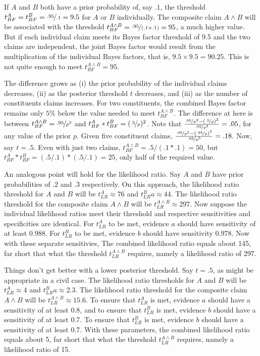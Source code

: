 \documentclass[
  10pt,
  dvipsnames,enabledeprecatedfontcommands]{scrartcl}
\begin{document}

If \(A\) and \(B\) both have a prior probability of, say \(.1\), the
threshold \(t^A_{BF}=t_{BF}^B=\nicefrac{.95}{.1}=9.5\) for \(A\) or
\(B\) individually. The composite claim \(A \wedge B\) will be
associated with the threshold
\(t^{A\wedge B}_{BF}=\nicefrac{.95}{(.1\times .1)}=95\), a much higher
value. But if each individual claim meets its Bayes factor threshold of
9.5 and the two claims are independent, the joint Bayes factor would
result from the multiplication of the individual Bayes factors, that is,
\(9.5 \times 9.5=90.25\). This is not quite enough to meet
\(t^{A\wedge B}_{BF}=95\).

The difference grows as (i) the prior probability of the individual
claims decreases, (ii) as the posterior threshold \(t\) decreases, and
(iii) as the number of constituents claims increases. For two
constituents, the combined Bayes factor remains only \(5\%\) below the
value needed to meet \(t_{BF}^{A\wedge B}\). The difference at here is
between \(t_{BF}^{A\wedge B}=\nicefrac{.95}{p^2}\) and
\(t_{BF}^{A}*t_{BF}^{B}=(\nicefrac{.5}{p})^{2}\). Note that
\(\frac{\nicefrac{.95}{p^2} - (\nicefrac{.5}{p})^{2}}{\nicefrac{.95}{p^2}}=.05\),
for any value of the prior \(p\). Given five constituent claims,
\(\frac{\nicefrac{.95}{p^5} - (\nicefrac{.95}{p})^{5}}{\nicefrac{.95}{p^5}}=.18\).
Now, say \(t=.5\). Even with just two claims,
\(t^{A\wedge B}_{BF}=.5/(.1*.1)=50\), but
\(t^A_{BF}*t_{BF}^B=(.5/.1)*(.5/.1)=25\), only half of the required
value.

An analogous point will hold for the likelihood ratio. Say \(A\) and
\(B\) have prior probabilities of \(.2\) and \(.3\) respectively. On
this approach, the likelihood ratio threshold for \(A\) and \(B\) will
be \(t_{LR}^{A}\approx 76\) and \(t_{LR}^{B}a\approx 44\). The
likelihood ratio threshold for the composite claim \(A \wedge B\) will
be \(t^{A\wedge B}_{LR}\approx 297\). Now suppose the individual
likelihood ratios meet their threshold and respective sensitivities and
specificities are identical. For \(t_{LR}^{A}\) to be met, evidence
\(a\) should have sensitivity of at least 0.988. For \(t_{LR}^{B}\) to
be met, evidence \(b\) should have sensitivity 0.978. Now with these
separate sensitivies, The combined likelihood ratio equals about 145,
far short that what the threshold \(t^{A\wedge B}_{LR}\) requires,
namely a likelihood ratio of 297.

Things don't get better with a lower posterior threshold. Say \(t= .5\),
as might be appropriate in a civil case. The likelihood ratio thresholds
for \(A\) and \(B\) will be \(t_{LR}^{A}\approx 4\) and
\(t_{LR}^{B}a\approx 2.3\). The likelihood ratio threshold for the
composite claim \(A \wedge B\) will be
\(t^{A\wedge B}_{LR}\approx 15.6\). To ensure that \(t_{LR}^{A}\) is
met, evidence \(a\) should have a sensitivity of at least 0.8, and to
ensure that \(t_{LR}^{B}\) is met, evidence \(b\) should have a
sensitivity of at least 0.7. To ensure that \(t_{LR}^{B}\) is met,
evidence \(b\) should have a sensitivity of at least 0.7. With these
parameters, the combined likelihood ratio equals about 5, far short that
what the threshold \(t^{A\wedge B}_{LR}\) requires, namely a likelihood
ratio of 15.
\end{document}
